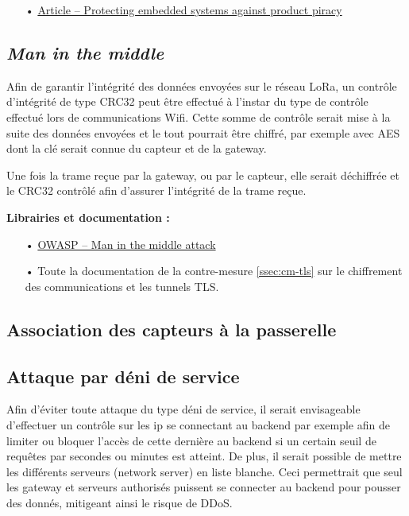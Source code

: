 \begin{itemize}
\item[•] \href{https://www.aisec.fraunhofer.de/content/dam/aisec/Dokumente/Publikationen/Studien_TechReports/englisch/Whitepaper_ProductProtection.pdf}{Article -- Protecting embedded systems against product piracy}
\end{itemize}

\subsection{\emph{Man in the middle}}
\label{ssec:cm-mitm}

Afin de garantir l'intégrité des données envoyées sur le réseau LoRa, un contrôle d'intégrité de type CRC32 peut être effectué à l'instar du type de contrôle effectué lors de communications Wifi. Cette somme de contrôle serait mise à la suite des données envoyées et le tout pourrait être chiffré, par exemple avec AES dont la clé serait connue du capteur et de la gateway.

Une fois la trame reçue par la gateway, ou par le capteur, elle serait déchiffrée et le CRC32 contrôlé afin d'assurer l'intégrité de la trame reçue.

\medskip
\textbf{Librairies et documentation :}

\begin{itemize}
\item[•] \href{https://www.owasp.org/index.php/Man-in-the-middle_attack}{OWASP -- Man in the middle attack}
\item[•] Toute la documentation de la contre-mesure \ref{ssec:cm-tls} sur le chiffrement des communications et les tunnels TLS.
\end{itemize}

\subsection{Association des capteurs à la passerelle}
\label{ssec:cm-association}

\subsection{Attaque par déni de service}
\label{ssec:cm-ddos}

Afin d'éviter toute attaque du type déni de service, il serait envisageable d'effectuer un contrôle sur les ip se connectant au backend par exemple afin de limiter ou bloquer l'accès de cette dernière au backend si un certain seuil de requêtes par secondes ou minutes est atteint. De plus, il serait possible de mettre les différents serveurs (network server) en liste blanche. Ceci permettrait que seul les gateway et serveurs authorisés puissent se connecter au backend pour pousser des donnés, mitigeant ainsi le risque de DDoS.

